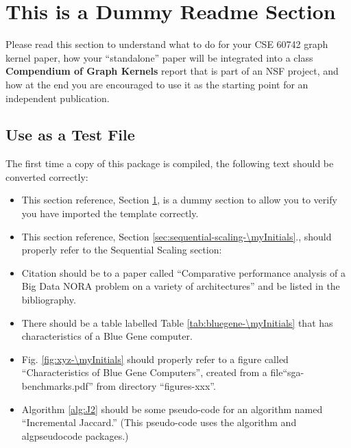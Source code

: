 \section{This is a Dummy Readme Section}\label{sec:sample-\myInitials}

Please read this section to understand what to do for your CSE 60742 graph kernel paper, how your ``standalone'' paper will be integrated into a class \textbf{Compendium of Graph Kernels} report that is part of an NSF project, and how at the end you are encouraged to use it as the starting point for an independent publication.

\subsection{Use as a Test File}
The first time a copy of this package is compiled, the following text should be converted correctly:

\begin{itemize}[noitemsep,nolistsep,leftmargin=*]

\item This section reference, Section \ref{sec:sample-\myInitials}, is a dummy section to allow you to verify you have imported the template correctly.

\item This section reference, Section \ref{sec:sequential-scaling-\myInitials}., should  properly refer to the Sequential Scaling section: 

\item Citation \cite{6567199} should be to a paper called ``Comparative performance analysis of a Big Data NORA problem on a variety of architectures'' and be listed in the bibliography.

\item There should be a table labelled Table \ref{tab:bluegene-\myInitials} that has characteristics of a Blue Gene computer.

\item Fig. \ref{fig:xyz-\myInitials} should properly refer to a figure called ``Characteristics of Blue Gene Computers'', created from a file``sga-benchmarks.pdf'' from directory ``figures-xxx''.

\item Algorithm \ref{alg:J2} should be some pseudo-code for an algorithm named ``Incremental Jaccard.'' (This pseudo-code uses the algorithm and algpseudocode packages.)
\end{itemize}


